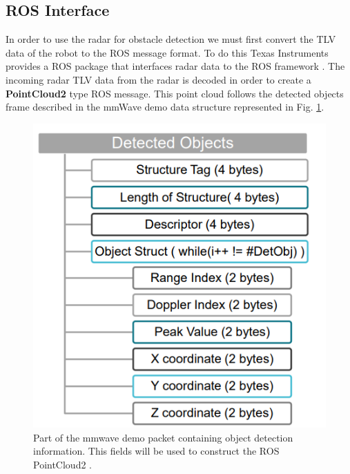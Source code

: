 



\subsection{ROS Interface}
In order to use the radar for obstacle detection we must first convert the \ac{TLV} data of the robot to the \ac{ROS} message format.
To do this Texas Instruments provides a \ac{ROS} package that interfaces radar data to the ROS framework \cite{tisetup}. The incoming radar \ac{TLV} data from the radar is decoded in order to create a  \textbf{PointCloud2} type ROS message.
This point cloud follows the detected objects frame described in the mmWave demo data structure \cite{mmdata} represented in Fig. \ref{fig:demodata}.
\begin{figure}[!htb]
    \centering
    \includegraphics[scale=0.6]{imgs/chapter4/demodata.png}
    \caption[Part of the mmwave demo packet]{Part of the mmwave demo packet containing object detection information. This fields will be used to construct the ROS PointCloud2 \cite{mmdata}.}
    \label{fig:demodata}
\end{figure}
